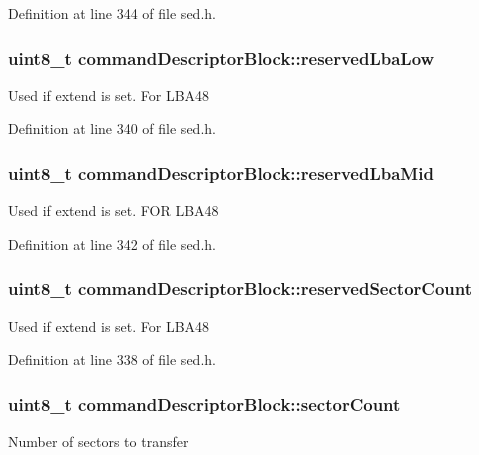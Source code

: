 Definition at line 344 of file sed.\+h.

\hypertarget{structcommandDescriptorBlock_a4a6bcc946c72cd6c5aa8060fc2521010}{
\subsubsection[{reserved\+Lba\+Low}]{\setlength{\rightskip}{0pt plus 5cm}uint8\+\_\+t command\+Descriptor\+Block\+::reserved\+Lba\+Low}}\label{structcommandDescriptorBlock_a4a6bcc946c72cd6c5aa8060fc2521010}
Used if extend is set. For L\+B\+A48 

Definition at line 340 of file sed.\+h.

\hypertarget{structcommandDescriptorBlock_a8d556f9d126816a3a06e2422630a43f4}{
\subsubsection[{reserved\+Lba\+Mid}]{\setlength{\rightskip}{0pt plus 5cm}uint8\+\_\+t command\+Descriptor\+Block\+::reserved\+Lba\+Mid}}\label{structcommandDescriptorBlock_a8d556f9d126816a3a06e2422630a43f4}
Used if extend is set. F\+O\+R L\+B\+A48 

Definition at line 342 of file sed.\+h.

\hypertarget{structcommandDescriptorBlock_a4798d143da5fadb3b44fe820f9c96930}{
\subsubsection[{reserved\+Sector\+Count}]{\setlength{\rightskip}{0pt plus 5cm}uint8\+\_\+t command\+Descriptor\+Block\+::reserved\+Sector\+Count}}\label{structcommandDescriptorBlock_a4798d143da5fadb3b44fe820f9c96930}
Used if extend is set. For L\+B\+A48 

Definition at line 338 of file sed.\+h.

\hypertarget{structcommandDescriptorBlock_a2e0f28faecba0a67ee5349cad5f011e9}{
\subsubsection[{sector\+Count}]{\setlength{\rightskip}{0pt plus 5cm}uint8\+\_\+t command\+Descriptor\+Block\+::sector\+Count}}\label{structcommandDescriptorBlock_a2e0f28faecba0a67ee5349cad5f011e9}
Number of sectors to transfer 

